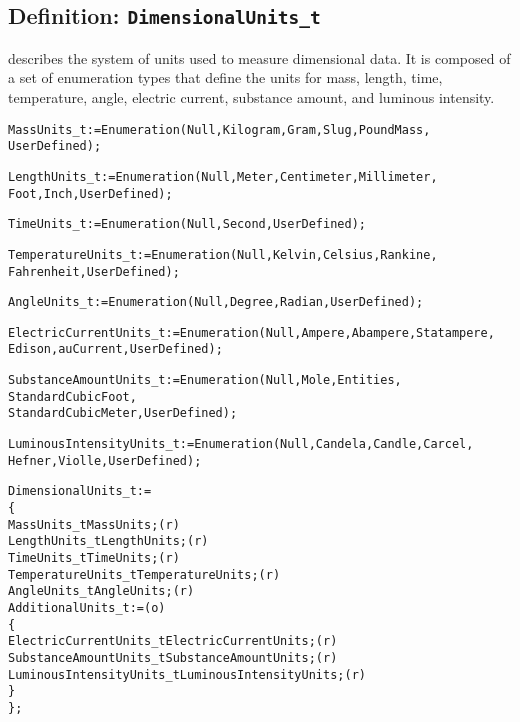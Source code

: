 \subsection{Definition: \texttt{DimensionalUnits\_t}}
\label{s:DimensionalUnits}

 describes the system of units used to measure
dimensional data.
It is composed of a set of enumeration types that define the units for
mass, length, time, temperature, angle, electric current, substance
amount, and luminous intensity.

\begin{alltt}
  MassUnits\_t              := Enumeration( Null, Kilogram, Gram, Slug, PoundMass,
                                           UserDefined ) ;

  LengthUnits\_t            := Enumeration( Null, Meter, Centimeter, Millimeter,
                                           Foot, Inch, UserDefined ) ;

  TimeUnits\_t              := Enumeration( Null, Second, UserDefined ) ;

  TemperatureUnits\_t       := Enumeration( Null, Kelvin, Celsius, Rankine,
                                           Fahrenheit, UserDefined ) ;

  AngleUnits\_t             := Enumeration( Null, Degree, Radian, UserDefined ) ;

  ElectricCurrentUnits\_t   := Enumeration( Null, Ampere, Abampere, Statampere,
                                           Edison, auCurrent, UserDefined ) ;

  SubstanceAmountUnits\_t   := Enumeration( Null, Mole, Entities,
                                           StandardCubicFoot,
                                           StandardCubicMeter, UserDefined ) ;

  LuminousIntensityUnits\_t := Enumeration( Null, Candela, Candle, Carcel,
                                           Hefner, Violle, UserDefined ) ;
\end{alltt}

\begin{alltt}
  DimensionalUnits\_t :=
    \{
    MassUnits\_t        MassUnits ;                                          (r)
    LengthUnits\_t      LengthUnits ;                                        (r)
    TimeUnits\_t        TimeUnits ;                                          (r)
    TemperatureUnits\_t TemperatureUnits ;                                   (r)
    AngleUnits\_t       AngleUnits ;                                         (r)
    AdditionalUnits\_t :=                                                    (o)
      \{
      ElectricCurrentUnits\_t   ElectricCurrentUnits ;                       (r)
      SubstanceAmountUnits\_t   SubstanceAmountUnits ;                       (r)
      LuminousIntensityUnits\_t LuminousIntensityUnits ;                     (r)
      \}
    \} ;
\end{alltt}

